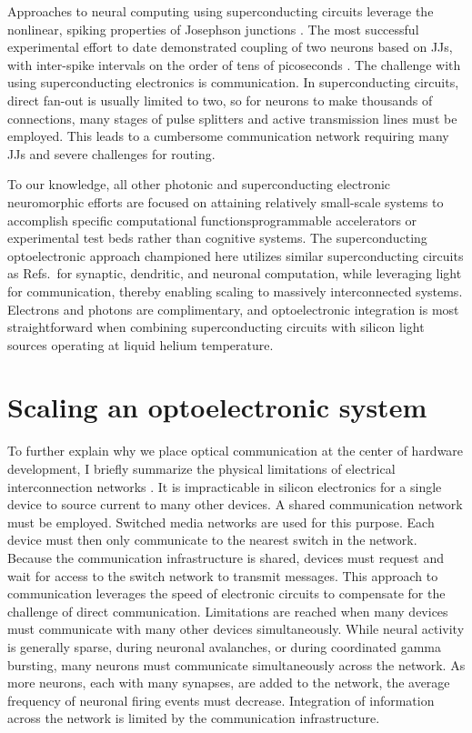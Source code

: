 \documentclass[twocolumn]{article}
\newcommand{\onlinecite}[1]{\hspace{-1 ex} \nocite{#1}\citenum{#1}}
\begin{document}
Approaches to neural computing using superconducting circuits leverage the nonlinear, spiking properties of Josephson junctions \cite{hias2007,sele2017,scdo2018}. The most successful experimental effort to date demonstrated coupling of two neurons based on JJs, with inter-spike intervals on the order of tens of picoseconds \cite{sele2017}. The challenge with using superconducting electronics is communication. In superconducting circuits, direct fan-out is usually limited to two, so for neurons to make thousands of connections, many stages of pulse splitters and active transmission lines must be employed. This leads to a cumbersome communication network requiring many JJs and severe challenges for routing. 

To our knowledge, all other photonic and superconducting electronic neuromorphic efforts are focused on attaining relatively small-scale systems to accomplish specific computational functions\textemdash programmable accelerators or experimental test beds rather than cognitive systems. The superconducting optoelectronic approach championed here utilizes similar superconducting circuits as Refs.\,\onlinecite{hias2007,sele2017,scdo2018} for synaptic, dendritic, and neuronal computation, while leveraging light for communication, thereby enabling scaling to massively interconnected systems. Electrons and photons are complimentary, and optoelectronic integration is most straightforward when combining superconducting circuits with silicon light sources operating at liquid helium temperature.

\section{\label{sec:communication}Scaling an optoelectronic system}
To further explain why we place optical communication at the center of hardware development, I briefly summarize the physical limitations of electrical interconnection networks \cite{hepa2012}. It is impracticable in silicon electronics for a single device to source current to many other devices. A shared communication network must be employed. Switched media networks are used for this purpose. Each device must then only communicate to the nearest switch in the network. Because the communication infrastructure is shared, devices must request and wait for access to the switch network to transmit messages. This approach to communication leverages the speed of electronic circuits to compensate for the challenge of direct communication. Limitations are reached when many devices must communicate with many other devices simultaneously. While neural activity is generally sparse, during neuronal avalanches, or during coordinated gamma bursting, many neurons must communicate simultaneously across the network. As more neurons, each with many synapses, are added to the network, the average frequency of neuronal firing events must decrease. Integration of information across the network is limited by the communication infrastructure.
\end{document}
